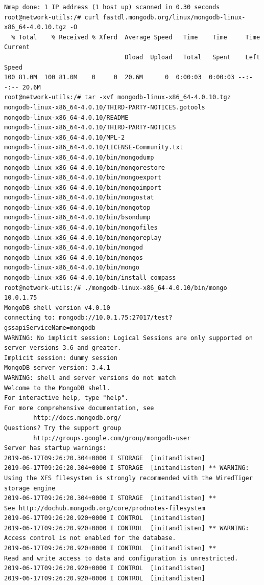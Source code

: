 \begin{lstlisting}
Nmap done: 1 IP address (1 host up) scanned in 0.30 seconds
root@network-utils:/# curl fastdl.mongodb.org/linux/mongodb-linux-x86_64-4.0.10.tgz -O
  % Total    % Received % Xferd  Average Speed   Time    Time     Time  Current
                                 Dload  Upload   Total   Spent    Left  Speed
100 81.0M  100 81.0M    0     0  20.6M      0  0:00:03  0:00:03 --:--:-- 20.6M
root@network-utils:/# tar -xvf mongodb-linux-x86_64-4.0.10.tgz
mongodb-linux-x86_64-4.0.10/THIRD-PARTY-NOTICES.gotools
mongodb-linux-x86_64-4.0.10/README
mongodb-linux-x86_64-4.0.10/THIRD-PARTY-NOTICES
mongodb-linux-x86_64-4.0.10/MPL-2
mongodb-linux-x86_64-4.0.10/LICENSE-Community.txt
mongodb-linux-x86_64-4.0.10/bin/mongodump
mongodb-linux-x86_64-4.0.10/bin/mongorestore
mongodb-linux-x86_64-4.0.10/bin/mongoexport
mongodb-linux-x86_64-4.0.10/bin/mongoimport
mongodb-linux-x86_64-4.0.10/bin/mongostat
mongodb-linux-x86_64-4.0.10/bin/mongotop
mongodb-linux-x86_64-4.0.10/bin/bsondump
mongodb-linux-x86_64-4.0.10/bin/mongofiles
mongodb-linux-x86_64-4.0.10/bin/mongoreplay
mongodb-linux-x86_64-4.0.10/bin/mongod
mongodb-linux-x86_64-4.0.10/bin/mongos
mongodb-linux-x86_64-4.0.10/bin/mongo
mongodb-linux-x86_64-4.0.10/bin/install_compass
root@network-utils:/# ./mongodb-linux-x86_64-4.0.10/bin/mongo 10.0.1.75
MongoDB shell version v4.0.10
connecting to: mongodb://10.0.1.75:27017/test?gssapiServiceName=mongodb
WARNING: No implicit session: Logical Sessions are only supported on server versions 3.6 and greater.
Implicit session: dummy session
MongoDB server version: 3.4.1
WARNING: shell and server versions do not match
Welcome to the MongoDB shell.
For interactive help, type "help".
For more comprehensive documentation, see
        http://docs.mongodb.org/
Questions? Try the support group
        http://groups.google.com/group/mongodb-user
Server has startup warnings:
2019-06-17T09:26:20.304+0000 I STORAGE  [initandlisten]
2019-06-17T09:26:20.304+0000 I STORAGE  [initandlisten] ** WARNING: Using the XFS filesystem is strongly recommended with the WiredTiger storage engine
2019-06-17T09:26:20.304+0000 I STORAGE  [initandlisten] **          See http://dochub.mongodb.org/core/prodnotes-filesystem
2019-06-17T09:26:20.920+0000 I CONTROL  [initandlisten]
2019-06-17T09:26:20.920+0000 I CONTROL  [initandlisten] ** WARNING: Access control is not enabled for the database.
2019-06-17T09:26:20.920+0000 I CONTROL  [initandlisten] **          Read and write access to data and configuration is unrestricted.
2019-06-17T09:26:20.920+0000 I CONTROL  [initandlisten]
2019-06-17T09:26:20.920+0000 I CONTROL  [initandlisten]

\end{lstlisting}
